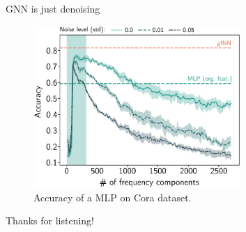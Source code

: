 \documentclass{beamer}
\begin{document}
    \begin{frame}{GNN is just denoising}
        \begin{figure}
            \centering
            \includegraphics[width=0.7\textwidth]{imgs/cora_freq}
            \caption{Accuracy of a MLP on Cora dataset.}
            \label{fig:freqcora}
        \end{figure}
    \end{frame}

    \begin{frame}[focus]
        Thanks for listening!
    \end{frame}

    \appendix
    \begin{frame}[allowframebreaks]
        \nocite{*}
        
        
    \end{frame}
\end{document}
